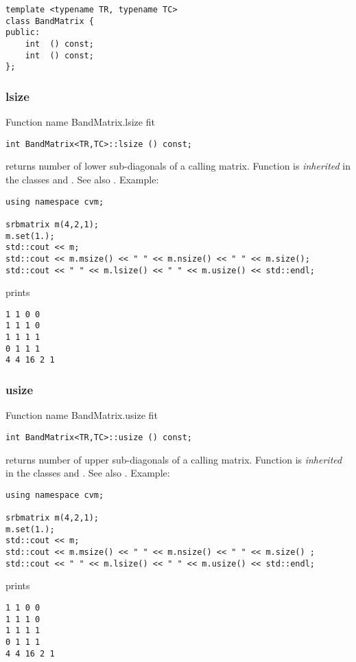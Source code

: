\bigskip
\noindent%
\verb"template <typename TR, typename TC>"\\
\verb"class BandMatrix {"\\
\verb"public:"\\
\verb"    int "\verb" () const;"\\
\verb"    int "\verb" () const;"\\
\verb"};"
\newpage


\subsubsection{lsize}
Function%
\pdfdest name {BandMatrix.lsize} fit
\begin{verbatim}
int BandMatrix<TR,TC>::lsize () const;
\end{verbatim}
returns number of lower sub-diagonals
of a calling matrix.
Function is \emph{inherited} in the classes
 and .
See also .
Example:
\begin{Verbatim}
using namespace cvm;

srbmatrix m(4,2,1);
m.set(1.);
std::cout << m;
std::cout << m.msize() << " " << m.nsize() << " " << m.size();
std::cout << " " << m.lsize() << " " << m.usize() << std::endl;
\end{Verbatim}
prints
\begin{Verbatim}
1 1 0 0
1 1 1 0
1 1 1 1
0 1 1 1
4 4 16 2 1
\end{Verbatim}
\newpage


\subsubsection{usize}
Function%
\pdfdest name {BandMatrix.usize} fit
\begin{verbatim}
int BandMatrix<TR,TC>::usize () const;
\end{verbatim}
returns number of upper sub-diagonals
of a calling matrix.
Function is \emph{inherited} in the classes
 and .
See also .
Example:
\begin{Verbatim}
using namespace cvm;

srbmatrix m(4,2,1);
m.set(1.);
std::cout << m;
std::cout << m.msize() << " " << m.nsize() << " " << m.size() ;
std::cout << " " << m.lsize() << " " << m.usize() << std::endl;
\end{Verbatim}
prints
\begin{Verbatim}
1 1 0 0
1 1 1 0
1 1 1 1
0 1 1 1
4 4 16 2 1
\end{Verbatim}
\newpage


